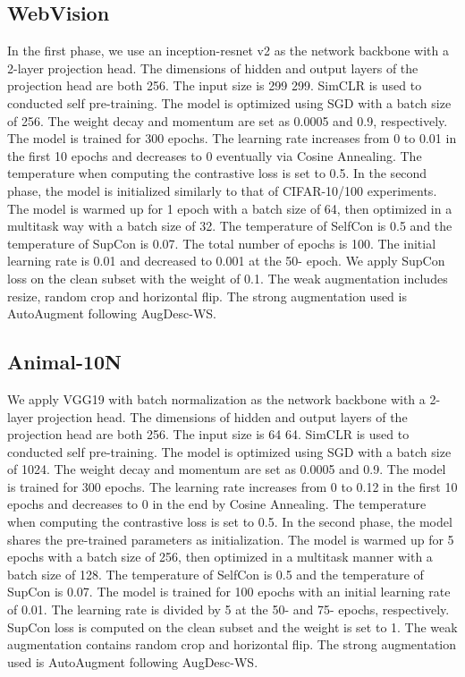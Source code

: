 \documentclass[letterpaper]{article} \usepackage{aaai22}  \usepackage{times}  \usepackage{helvet}  \usepackage{courier}  \usepackage[hyphens]{url}  \usepackage{graphicx} \usepackage{subfigure}
\begin{document}
\subsection{WebVision}
In the first phase, we use an inception-resnet v2 as the network backbone with a 2-layer projection head. The  dimensions of hidden and output layers of the projection head are both 256. The input size is 299  299. SimCLR is used to conducted self pre-training. The model is optimized using SGD with a batch size of 256. The weight decay and momentum are set as 0.0005 and 0.9, respectively. The model is trained for 300 epochs. The learning rate increases from 0 to 0.01 in the first 10 epochs and decreases to 0 eventually via Cosine Annealing. The temperature  when computing the contrastive loss is set to 0.5. In the second phase, the model is initialized similarly to that of CIFAR-10/100 experiments. The model is warmed up for 1 epoch with a batch size of 64, then optimized in a multitask way with a batch size of 32. The temperature  of SelfCon is 0.5 and the temperature  of SupCon is 0.07. The total number of epochs is 100. The initial learning rate is 0.01 and decreased to 0.001 at the 50- epoch. We apply SupCon loss on the clean subset with the weight of 0.1. The weak augmentation includes resize, random crop and horizontal flip. The strong augmentation used is AutoAugment following AugDesc-WS. 

\subsection{Animal-10N}
We apply VGG19 with batch normalization as the network backbone with a 2-layer projection head. The dimensions of hidden and output layers of the projection head are both 256. The input size is 64  64. SimCLR is used to conducted self pre-training. The model is optimized using SGD with a batch size of 1024. The weight decay and momentum are set as 0.0005 and 0.9. The model is trained for 300 epochs. The learning rate increases from 0 to 0.12 in the first 10 epochs and decreases to 0 in the end by Cosine Annealing. The temperature  when computing the contrastive loss is set to 0.5. In the second phase, the model shares the pre-trained parameters as initialization. The model is warmed up for 5 epochs with a batch size of 256, then optimized in a multitask manner with a batch size of 128. The temperature  of SelfCon is 0.5 and the temperature  of SupCon is 0.07. The model is trained for 100 epochs with an initial learning rate of 0.01. The learning rate is divided by 5 at the 50- and 75- epochs, respectively. SupCon loss is computed on the clean subset and the weight is set to 1. The weak augmentation contains random crop and horizontal flip. The strong augmentation used is AutoAugment following AugDesc-WS. 
\end{document}
